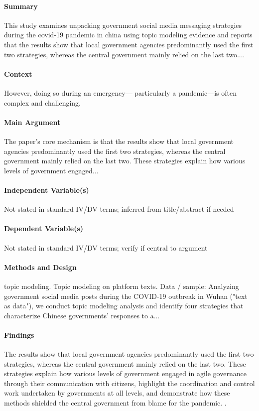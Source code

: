\documentclass[12pt]{article}
\begin{document}
\paragraph{Summary} This study examines unpacking government social media messaging strategies during the covid-19 pandemic in china using topic modeling evidence and reports that the results show that local government agencies predominantly used the first two strategies, whereas the central government mainly relied on the last two....

\paragraph{Context} However, doing so during an emergency--- particularly a pandemic---is often complex and challenging.

\paragraph{Main Argument} The paper's core mechanism is that the results show that local government agencies predominantly used the first two strategies, whereas the central government mainly relied on the last two. These strategies explain how various levels of government engaged...

\paragraph{Independent Variable(s)} Not stated in standard IV/DV terms; inferred from title/abstract if needed

\paragraph{Dependent Variable(s)} Not stated in standard IV/DV terms; verify if central to argument

\paragraph{Methods and Design} topic modeling. Topic modeling on platform texts. Data / sample: Analyzing government social media posts during the COVID-19 outbreak in Wuhan ("text as data"), we conduct topic modeling analysis and identify four strategies that characterize Chinese governments' responses to a...

\paragraph{Findings} The results show that local government agencies predominantly used the first two strategies, whereas the central government mainly relied on the last two. These strategies explain how various levels of government engaged in agile governance through their communication with citizens, highlight the coordination and control work undertaken by governments at all levels, and demonstrate how these methods shielded the central government from blame for the pandemic. .
\end{document}
